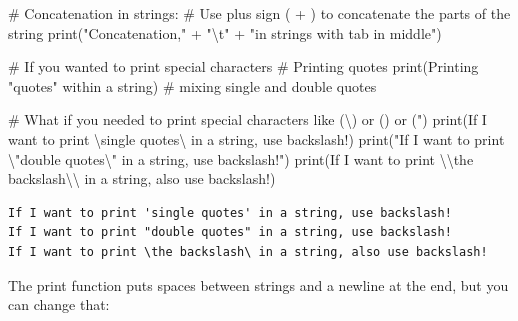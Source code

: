 \documentclass[
  letterpaper,
  DIV=11,
  numbers=noendperiod]{scrreprt}
\newenvironment{Shaded}{\begin{snugshade}}{\end{snugshade}}
\newcommand{\BuiltInTok}[1]{\textcolor[rgb]{0.00,0.23,0.31}{#1}}
\newcommand{\CharTok}[1]{\textcolor[rgb]{0.13,0.47,0.30}{#1}}
\newcommand{\CommentTok}[1]{\textcolor[rgb]{0.37,0.37,0.37}{#1}}
\newcommand{\NormalTok}[1]{\textcolor[rgb]{0.00,0.23,0.31}{#1}}
\newcommand{\OperatorTok}[1]{\textcolor[rgb]{0.37,0.37,0.37}{#1}}
\newcommand{\StringTok}[1]{\textcolor[rgb]{0.13,0.47,0.30}{#1}}
\begin{document}
\begin{Shaded}
\begin{Highlighting}[]
\CommentTok{\# Concatenation in strings: }
\CommentTok{\# Use plus sign ( + ) to concatenate the parts of the string}
\BuiltInTok{print}\NormalTok{(}\StringTok{"Concatenation,"} \OperatorTok{+} \StringTok{"}\CharTok{\textbackslash{}t}\StringTok{"} \OperatorTok{+} \StringTok{"in strings with tab in middle"}\NormalTok{)}
\end{Highlighting}
\end{Shaded}

\begin{Shaded}
\begin{Highlighting}[]
\CommentTok{\# If you wanted to print special characters}
\CommentTok{\# Printing quotes}
\BuiltInTok{print}\NormalTok{(}\StringTok{\textquotesingle{}Printing "quotes" within a string\textquotesingle{}}\NormalTok{) }\CommentTok{\# mixing single and double quotes}
\end{Highlighting}
\end{Shaded}

\begin{Shaded}
\begin{Highlighting}[]
\CommentTok{\# What if you needed to print special characters like (\textbackslash{}) or (\textquotesingle{}) or (")}
\BuiltInTok{print}\NormalTok{(}\StringTok{\textquotesingle{}If I want to print }\CharTok{\textbackslash{}\textquotesingle{}}\StringTok{single quotes}\CharTok{\textbackslash{}\textquotesingle{}}\StringTok{ in a string, use backslash!\textquotesingle{}}\NormalTok{)}
\BuiltInTok{print}\NormalTok{(}\StringTok{"If I want to print }\CharTok{\textbackslash{}"}\StringTok{double quotes}\CharTok{\textbackslash{}"}\StringTok{ in a string, use backslash!"}\NormalTok{)}
\BuiltInTok{print}\NormalTok{(}\StringTok{\textquotesingle{}If I want to print }\CharTok{\textbackslash{}\textbackslash{}}\StringTok{the backslash}\CharTok{\textbackslash{}\textbackslash{}}\StringTok{ in a string, also use backslash!\textquotesingle{}}\NormalTok{)}
\end{Highlighting}
\end{Shaded}

\begin{verbatim}
If I want to print 'single quotes' in a string, use backslash!
If I want to print "double quotes" in a string, use backslash!
If I want to print \the backslash\ in a string, also use backslash!
\end{verbatim}

The print function puts spaces between strings and a newline at the end,
but you can change that:
\end{document}
